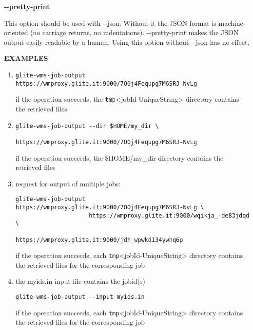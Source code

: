 \textbf{-{}-pretty-print}

This option should be used with -{}-json. Without it the JSON format is machine-oriented 
(no carriage returns, no indentations). 
-{}-pretty-print makes the JSON output easily readable by a human. Using this option without -{}-json has no effect.





\medskip
\textbf{EXAMPLES}
\smallskip


\begin{enumerate}


\item  
\begin{verbatim}glite-wms-job-output https://wmproxy.glite.it:9000/7O0j4Fequpg7M6SRJ-NvLg
\end{verbatim} 

if the operation succeeds, the \verb /tmp/<jobId-UniqueString> {}  directory contains the retrieved files


\item 
\begin{verbatim}
glite-wms-job-output --dir $HOME/my_dir \
                     https://wmproxy.glite.it:9000/7O0j4Fequpg7M6SRJ-NvLg
\end{verbatim}

if the operation succeeds, the \$HOME/my\_dir directory contains the retrieved files


\item  request for output of multiple jobs:
\begin{verbatim}
glite-wms-job-output https://wmproxy.glite.it:9000/7O0j4Fequpg7M6SRJ-NvLg \
                     https://wmproxy.glite.it:9000/wqikja_-de83jdqd \
                     https://wmproxy.glite.it:9000/jdh_wpwkd134ywhq6p
\end{verbatim}

if the operation succeeds, each \verb /tmp/<jobId-UniqueString> {} directory contains the retrieved files for the corresponding job


\item  the myids.in input file contains the jobid(s)
\begin{verbatim}
glite-wms-job-output --input myids.in
\end{verbatim}
if the operation succeeds, each \verb /tmp/<jobId-UniqueString> {} directory contains the retrieved files for the corresponding job

\end{enumerate}



